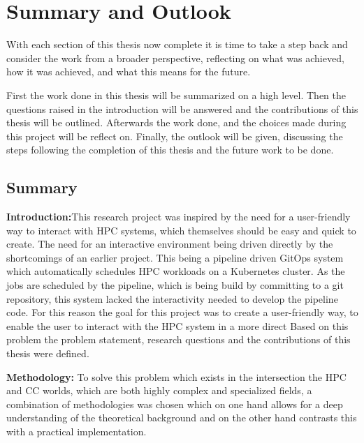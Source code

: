 \chapter{Summary and Outlook}
\label{summary}

With each section of this thesis now complete it is time to take
a step back and consider the work from a broader perspective,
reflecting on what was achieved, how it was achieved,
and what this means for the future.

First the work done in this thesis will be summarized on a high level.
Then the questions raised in the introduction will be answered and
the contributions of this thesis will be outlined.
Afterwards the work done, and the choices made during this project will
be reflect on.
Finally, the outlook will be given, discussing the steps following
the completion of this thesis and the future work to be done.

\section{Summary}





\textbf{Introduction:}This research project was inspired by the need for a user-friendly way to interact with
\ac{HPC} systems, which themselves should be easy and quick to create.
The need for an interactive environment being driven directly by the shortcomings of an earlier project.
This being a pipeline driven \gls{GitOps} system which automatically schedules \ac{HPC} workloads on a Kubernetes cluster.
As the jobs are scheduled by the pipeline, which is being build by committing to a git repository,
this system lacked the interactivity needed to develop the pipeline code.
For this reason the goal for this project was to create a user-friendly way,
to enable the user to interact with the \ac{HPC} system in a more direct
Based on this problem the problem statement,
research questions and the contributions of this thesis were defined.


\textbf{Methodology: }To solve this problem which exists in the intersection the \ac{HPC} and \ac{CC} worlds,
which are both highly complex and specialized fields,
a combination of methodologies was chosen which on one hand allows for a deep
understanding of the theoretical background and on the other hand contrasts
this with a practical implementation.

